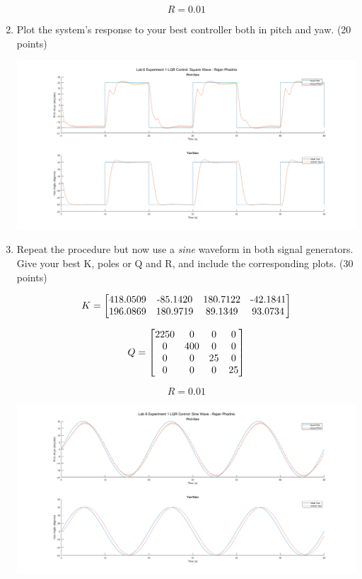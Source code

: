 \documentclass[11pt]{article}
\begin{document}
\begin{enumerate}
\[R=0.01\]

\vspace{1cm} %


\newpage
    
    \item Plot the system's response to your best controller both in pitch and yaw. (20 points)
    
    \centering
  \includegraphics[width=5in]{e1_square.png}
    
     \item Repeat the procedure but now use a \textit{sine} waveform in both signal generators. Give your best K, poles or Q and R, and include the corresponding plots. (30 points)

 \[K=\begin{bmatrix}
    $418.0509$ & $-85.1420$ & $180.7122$ & $-42.1841$\\
    $196.0869$ & $180.9719$ & $89.1349$ & $93.0734$\end{bmatrix}\]

\[Q=\begin{bmatrix}
$2250$ & $0$ & $0$ & $0$\\
$0$ & $400$ & $0$ & $0$\\
$0$ & $0$ & $25$ & $0$\\
$0$ & $0$ & $0$ & $25$
\end{bmatrix}\]

\[R=0.01\]

    \centering
  \includegraphics[width=5in]{e1_sine.png}
\newpage

    

    \vspace{7 cm}
    
    
\end{enumerate}
\end{document}
